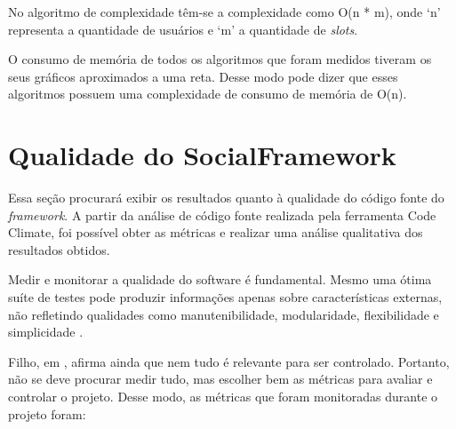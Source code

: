 No algoritmo de complexidade têm-se a complexidade como O(n * m), onde `n' representa a quantidade de usuários e `m' a quantidade de \textit{slots}.

O consumo de memória de todos os algoritmos que foram medidos tiveram os seus gráficos aproximados a uma reta. Desse modo pode dizer que esses algoritmos possuem uma complexidade de consumo de memória de O(n).

\section{Qualidade do SocialFramework}

Essa seção procurará exibir os resultados quanto à qualidade do código fonte do \textit{framework}. A partir da análise de código fonte realizada pela ferramenta Code Climate, foi possível obter as métricas e realizar uma análise qualitativa dos resultados obtidos.

Medir e monitorar a qualidade do software é fundamental. Mesmo uma ótima suíte de testes pode produzir informações apenas sobre características externas, não refletindo qualidades como manutenibilidade, modularidade, flexibilidade e simplicidade \cite{Filho:2013}.

Filho, em \cite{Filho:2013}, afirma ainda que nem tudo é relevante para ser controlado. Portanto, não se deve procurar medir tudo, mas escolher bem as métricas para avaliar e controlar o projeto. Desse modo, as métricas que foram monitoradas durante o projeto foram:

